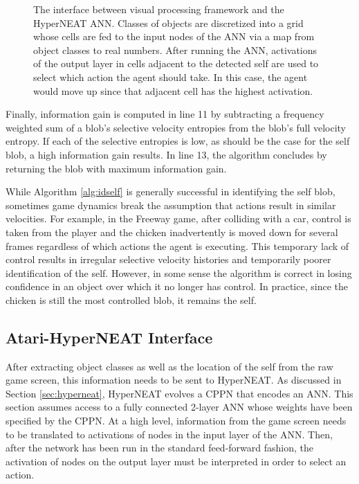 \documentclass{sig-alternate}
\begin{document}
\begin{figure}
 \caption{The interface between visual processing framework and the HyperNEAT ANN. Classes of objects are discretized into a grid whose cells are fed to the input nodes of the ANN via a map from object classes to real numbers. After running the ANN, activations of the output layer in cells adjacent to the detected self are used to select which action the agent should take. In this case, the agent would move up since that adjacent cell has the highest activation.}
 \label{fig:interface}
\end{figure}

Finally, information gain is computed in line 11 by subtracting a frequency weighted sum of a blob's selective velocity entropies from the blob's full velocity entropy. If each of the selective entropies is low, as should be the case for the self blob, a high information gain results. In line 13, the algorithm concludes by returning the blob with maximum information gain.

While Algorithm \ref{alg:idself} is generally successful in identifying the self blob, sometimes game dynamics break the assumption that actions result in similar velocities. For example, in the Freeway game, after colliding with a car, control is taken from the player and the chicken inadvertently is moved down for several frames regardless of which actions the agent is executing. This temporary lack of control results in irregular selective velocity histories and temporarily poorer identification of the self. However, in some sense the algorithm is correct in losing confidence in an object over which it no longer has control. In practice, since the chicken is still the most controlled blob, it remains the self.

\subsection{Atari-HyperNEAT Interface}
\label{sec:interface}
After extracting object classes as well as the location of the self from the raw game screen, this information needs to be sent to HyperNEAT. As discussed in Section \ref{sec:hyperneat}, HyperNEAT evolves a CPPN that encodes an ANN. This section assumes access to a fully connected 2-layer ANN whose weights have been specified by the CPPN. At a high level, information from the game screen needs to be translated to activations of nodes in the input layer of the ANN. Then, after the network has been run in the standard feed-forward fashion, the activation of nodes on the output layer must be interpreted in order to select an action.
\end{document}
